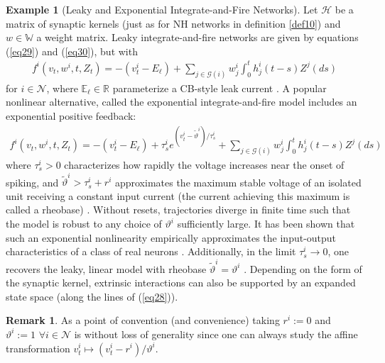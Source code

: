 \documentclass[12pt, oneside]{report}
\newcommand{\E}{\mathbb{E}}
\newcommand{\mbb}[1]{\mathbb{#1}}
\newcommand{\1}[1]{\mathbbm{1}_{\{#1\}}}
\newcommand{\mc}[1]{\mathcal{#1}}
\theoremstyle{definition}
\newtheorem{example}[theorem]{Example}
\newtheorem{remark}[theorem]{Remark}
\begin{document}
\begin{example}[Leaky and Exponential Integrate-and-Fire Networks]\label{ex2}
Let $\mc{H}$ be a matrix of synaptic kernels (just as for NH networks in
definition \ref{def10}) and $w\in\mbb{W}$ a weight matrix. Leaky
integrate-and-fire networks are given by equations (\ref{eq29}) and
(\ref{eq30}), but with
\begin{align*}
    f^i(v_t,w^i,t,Z_t)=-(v^i_t-E_\ell)+\sum_{j\in\mc{G}(i)}w^i_j\int_0^th^i_j(t-s)Z^j(ds)
\end{align*}
for $i\in\mc{N}$, where $\E_\ell\in\mbb{R}$ parameterize a CB-style leak current
\cite{Knight_1972}. A popular nonlinear alternative, called the exponential
integrate-and-fire model \cite{Fourcaud-Trocmé_Hansel_Van_Vreeswijk_Brunel_2003}
includes an exponential positive feedback:
\begin{align*}
    f^i(v_t,w^i,t,Z_t)=-(v^i_t-E_\ell)+\tau_s^ie^{(v^i_t-\tilde{\vartheta}^i)/\tau^i_s}+\sum_{j\in\mc{G}(i)}w^i_j\int_0^th^i_j(t-s)Z^j(ds)
\end{align*}
where $\tau^i_s>0$ characterizes how rapidly the voltage increases near the
onset of spiking, and $\tilde{\vartheta}^i>\tau^i_s+r^i$ approximates the
maximum stable voltage of an isolated unit receiving a constant input current
(the current achieving this maximum is called  a rheobase)
\cite{Gerstner_Kistler_Naud_Paninski_2014}. Without resets, trajectories diverge
in finite time \cite{Touboul_2009} such that the model is robust to any choice
of $\vartheta^i$ sufficiently large. It has been shown that such an exponential
nonlinearity empirically approximates the input-output characteristics of a
class of real neurons
\cite{Badel_Lefort_Brette_Petersen_Gerstner_Richardson_2008}. Additionally, in
the limit $\tau^i_s\rightarrow 0$, one recovers the leaky, linear model with
rheobase $\tilde{\vartheta}^i=\vartheta^i$
\cite{Fourcaud-Trocmé_Hansel_Van_Vreeswijk_Brunel_2003}. Depending on the form
of the synaptic kernel, extrinsic interactions can also be supported by an
expanded state space (along the lines of (\ref{eq28})).
\end{example}
\begin{remark}
    As a point of convention (and convenience) taking $r^i:=0$ and
    $\vartheta^i:=1$ $\forall i\in\mc{N}$ is without loss of generality since
    one can always study the affine transformation $v^i_t\mapsto
    (v^i_t-r^i)/\vartheta^i$. 
\end{remark}
\end{document}
